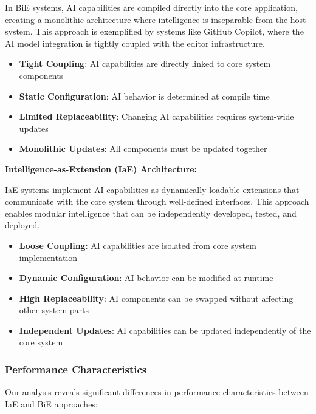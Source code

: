 In BiE systems, AI capabilities are compiled directly into the core application, creating a monolithic architecture where intelligence is inseparable from the host system. This approach is exemplified by systems like GitHub Copilot, where the AI model integration is tightly coupled with the editor infrastructure.

\begin{itemize}
    \item \textbf{Tight Coupling}: AI capabilities are directly linked to core system components
    \item \textbf{Static Configuration}: AI behavior is determined at compile time
    \item \textbf{Limited Replaceability}: Changing AI capabilities requires system-wide updates
    \item \textbf{Monolithic Updates}: All components must be updated together
\end{itemize}

\textbf{Intelligence-as-Extension (IaE) Architecture:}

IaE systems implement AI capabilities as dynamically loadable extensions that communicate with the core system through well-defined interfaces. This approach enables modular intelligence that can be independently developed, tested, and deployed.

\begin{itemize}
    \item \textbf{Loose Coupling}: AI capabilities are isolated from core system implementation
    \item \textbf{Dynamic Configuration}: AI behavior can be modified at runtime
    \item \textbf{High Replaceability}: AI components can be swapped without affecting other system parts
    \item \textbf{Independent Updates}: AI capabilities can be updated independently of the core system
\end{itemize}

\subsubsection{Performance Characteristics}

Our analysis reveals significant differences in performance characteristics between IaE and BiE approaches:

